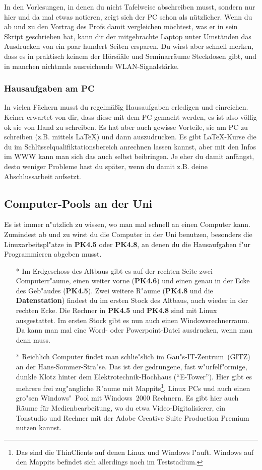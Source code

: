 \begin{multicols}{2}
			In den Vorlesungen, in denen du nicht Tafelweise abschreiben musst, sondern nur hier und da mal etwas notieren, zeigt sich der PC schon als nützlicher. Wenn du ab und zu den Vortrag des Profs damit vergleichen möchtest, was er in sein Skript geschrieben hat, kann dir der mitgebrachte Laptop unter Umständen das Ausdrucken von ein paar hundert Seiten ersparen. Du wirst aber schnell merken, dass es in praktisch keinem der Hörsääle und Seminarräume Steckdosen gibt, und in manchen nichtmals ausreichende WLAN-Signalstärke.

		\subsubsection{Hausaufgaben am PC}
			In vielen Fächern musst du regelmäßig Hausaufgaben erledigen und einreichen. Keiner erwartet von dir, dass diese mit dem PC gemacht werden, es ist also völlig ok sie von Hand zu schreiben. Es hat aber auch gewisse Vorteile, sie am PC zu schreiben (z.B. mittels \LaTeX) und dann auszudrucken. Es gibt \LaTeX-Kurse die du im Schlüsselqualifiktationsbereich anrechnen lassen kannst, aber mit den Infos im WWW kann man sich das auch selbst beibringen. Je eher du damit anfängst, desto weniger Probleme hast du später, wenn du damit z.B. deine Abschlussarbeit aufsetzt.

		\subsection{Computer-Pools an der Uni}
			Es ist immer n"utzlich zu wissen, wo man mal schnell an einen Computer kann. Zumindest ab und zu wirst du die Computer in der Uni benutzen, besonders die Linuxarbeitspl"atze in \textbf{PK4.5} oder \textbf{PK4.8}, an denen du die Hausaufgaben f"ur Programmieren abgeben musst.

			\begin{itemize}
				\item[*] Im Erdgeschoss des Altbaus gibt es auf der rechten Seite zwei Computerr"aume, einen weiter vorne (\textbf{PK4.6}) und einen genau in der Ecke des Geb"audes (\textbf{PK4.5}). Zwei weitere R"aume (\textbf{PK4.8} und die \textbf{Datenstation}) findest du im ersten Stock des Altbaus, auch wieder in der rechten Ecke. Die Rechner in \textbf{PK4.5} und \textbf{PK4.8} sind mit Linux ausgestattet. Im ersten Stock gibt es nun auch einen Windowsrechnerraum. Da kann man mal eine Word- oder Powerpoint-Datei ausdrucken, wenn man denn muss.

				\item[*] Reichlich Computer findet man schlie"slich im Gau"s-IT-Zentrum~(GITZ) an der Hans-Sommer-Stra"se. Das ist der gedrungene, fast w"urfelf"ormige, dunkle Klotz hinter dem Elektrotechnik-Hochhaus ("`E-Tower"'). Hier gibt es mehrere frei zug"angliche R"aume mit Mappits\footnote{Das sind die ThinClients auf denen Linux und Windows l"auft. Windows auf den Mappits befindet sich allerdings noch im Teststadium.}, Linux PCs und auch einen gro"sen Windows"~Pool mit Windows~2000 Rechnern. Es gibt hier auch Räume für Medienbearbeitung, wo du etwa Video-Digitalisierer, ein Tonstudio und Rechner mit der Adobe Creative Suite Production Premium nutzen kannst.


\end{itemize}
\end{multicols}
